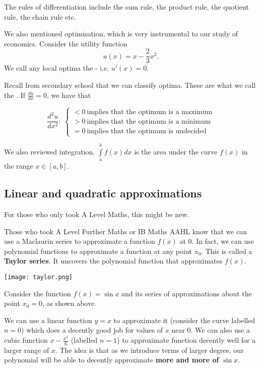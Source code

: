 \documentclass[a4paper, 12pt,oneside,openany]{book}
\begin{document}
The rules of differentiation include the sum rule, the product rule, the quotient rule, the chain rule etc.

We also mentioned optimisation, which is very instrumental to our study of economics. Consider the utility function $$u(x) = x-\frac{2}{3}x^2.$$ We call any local optima the  - i.e. $u'(x)=0$. 

Recall from secondary school that we can classify optima. These are what we call the . If $\frac{du}{dx}=0$, we have that 

$$\frac{d^2u}{dx^2}: \  \begin{cases}
	<0 \ \text{implies that the optimum is a maximum} \\
	>0 \ \text{implies that the optimum is a minimum} \\
	=0 \ \text{implies that the optimum is undecided}
\end{cases}$$

We also reviewed integration. $\int\limits_a^b f(x) dx$ is the area under the curve $f(x)$ in the range $x \in [a, b]$.

\subsection{Linear and quadratic approximations}

For those who only took A Level Maths, this might be new.

Those who took A Level Further Maths or IB Maths AAHL know that we can use a Maclaurin series to approximate a function $f(x)$ at $0$. In fact, we can use polynomial functions to approximate a function at any point $x_0$. This is called a \textbf{Taylor series}. It uncovers the polynomial function that approximates $f(x)$.

\texttt{[image: taylor.png]} 

Consider the function $f(x)=\sin x$ and its series of approximations about the point $x_0=0$, as shown above. 

We can use a linear function $y=x$ to approximate it (consider the curve labelled $n=0$) which does a decently good job for values of $x$ near 0. We can also use a cubic function $x-\frac{x^3}{6}$ (labelled $n=1$) to approximate function decently well for a larger range of $x$. The idea is that as we introduce terms of larger degree, our polynomial will be able to decently approximate \textbf{more and more of} $\sin x$.
\end{document}
